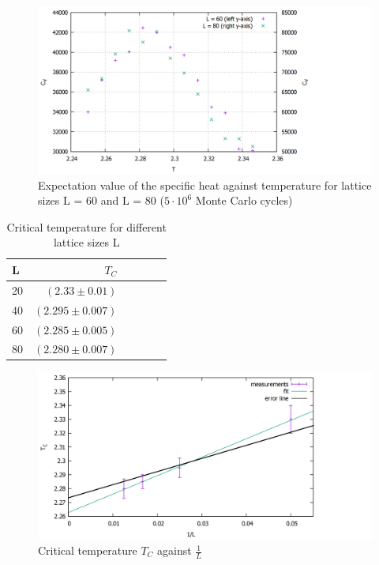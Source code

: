 \documentclass[10pt,a4paper]{article}
\begin{document}
\begin{figure}[h]
	\includegraphics[width=\textwidth]{cv6080.png}
	\centering
	\caption{Expectation value of the specific heat against temperature for lattice sizes L = 60 and L = 80 ($5 \cdot 10^6$ Monte Carlo cycles)}
	\label{cv6080}
\end{figure}

\begin{table}[h!]
	\centering
	\begin{tabular}{|l|r|c|lrp{16cm}}\hline
		L & $T_C$ \\\hline
		20 & $(2.33 \pm 0.01)$\\
		40 & $(2.295 \pm 0.007)$\\
		60 & $(2.285 \pm 0.005)$\\
		80 & $(2.280 \pm 0.007)$\\\hline
	\end{tabular}
	\caption{Critical temperature for different lattice sizes L }
	\label{tc}
\end{table}

\begin{figure}[h]
	\includegraphics[width=\textwidth]{tc2.png}
	\centering
	\caption{Critical temperature $T_C$ against $\frac{1}{L}$}
	\label{tc2}
\end{figure}
\end{document}
